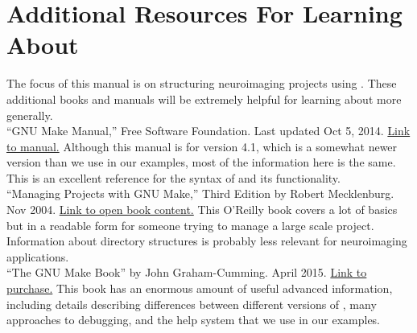 \section{Additional Resources For Learning About \maken{}}
The focus of this manual is on structuring neuroimaging projects using \maken{}. These additional books and manuals will be extremely helpful for learning about \maken{} more generally. \\

``GNU Make Manual,'' Free Software Foundation. Last updated Oct 5, 2014. \href{http://www.gnu.org/software/make/manual/}{Link to manual.} Although this manual is for version 4.1, which is a somewhat newer version than we use in our examples, most of the information here is the same. This is an excellent reference for the syntax of \maken{} and its functionality. 
\\

``Managing Projects with GNU Make,'' Third Edition by Robert Mecklenburg. Nov 2004. \href{http://www.oreilly.com/openbook/make3/book/index.csp}{Link to open book content.} This O'Reilly book covers a lot of basics but in a readable form for someone trying to manage a large scale project. Information about directory structures is probably less relevant for neuroimaging applications. 
\\

``The GNU Make Book'' by John Graham-Cumming. April 2015. \href{https://www.nostarch.com/gnumake}{Link to purchase.} This book has an enormous amount of useful advanced information, including details describing differences between different versions of \maken{}, many approaches to debugging, and the help system that we use in our examples. 
